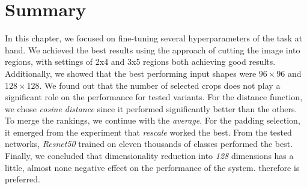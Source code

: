 

\section{Summary}

In this chapter, we focused on fine-tuning several hyperparameters of the task at hand. We achieved the best results using the approach of cutting the image into regions, with settings of 2x4 and 3x5 regions both achieving good results. Additionally, we showed that the best performing input shapes were $96\times 96$ and $128 \times 128$.  We found out that the number of selected crops does not play a significant role on the performance for tested variants. For the distance function, we chose \emph{cosine distance} since it performed significantly better than the others. To merge the rankings, we continue with the \emph{average}. For the padding selection, it emerged from the experiment that \emph{rescale} worked the best. From the tested networks, \emph{Resnet50} trained on eleven thousands of classes performed the best. Finally, we concluded that dimensionality reduction into \emph{128} dimensions has a little, almost none negative effect on the performance of the system. 
 therefore is preferred. 
